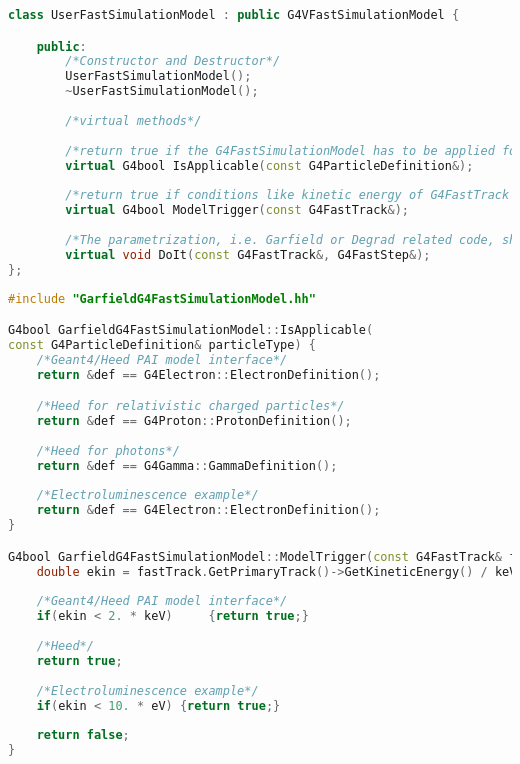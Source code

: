 \documentclass[preprint,12pt,sort&compress]{elsarticle}
\begin{document}
\newpage

\begin{lstlisting}[label=code_G4FastSimulationModel_class,language=C++,caption=Class definition of the user-defined class derived from the G4VFastSimulationModel. ]
class UserFastSimulationModel : public G4VFastSimulationModel {

	public:
	    /*Constructor and Destructor*/
	    UserFastSimulationModel();
	    ~UserFastSimulationModel();
	    
	    /*virtual methods*/
	    
	    /*return true if the G4FastSimulationModel has to be applied for a particle type*/
	    virtual G4bool IsApplicable(const G4ParticleDefinition&);
	    
	    /*return true if conditions like kinetic energy of G4FastTrack are fulfilled*/
	    virtual G4bool ModelTrigger(const G4FastTrack&);
	    
	    /*The parametrization, i.e. Garfield or Degrad related code, should be implemented here*/
	    virtual void DoIt(const G4FastTrack&, G4FastStep&);
};
\end{lstlisting}

\newpage

\begin{lstlisting}[label=code_G4FastSimulationModel,caption=G4FastSimulationModel.,language=C++]
#include "GarfieldG4FastSimulationModel.hh"

G4bool GarfieldG4FastSimulationModel::IsApplicable(
const G4ParticleDefinition& particleType) {
	/*Geant4/Heed PAI model interface*/
	return &def == G4Electron::ElectronDefinition();

	/*Heed for relativistic charged particles*/
	return &def == G4Proton::ProtonDefinition();
	
	/*Heed for photons*/
	return &def == G4Gamma::GammaDefinition();
	
	/*Electroluminescence example*/
	return &def == G4Electron::ElectronDefinition();
}

G4bool GarfieldG4FastSimulationModel::ModelTrigger(const G4FastTrack& fastTrack) {
	double ekin = fastTrack.GetPrimaryTrack()->GetKineticEnergy() / keV;
	
	/*Geant4/Heed PAI model interface*/
	if(ekin < 2. * keV) 	{return true;}
	
	/*Heed*/
	return true;
	
	/*Electroluminescence example*/
	if(ekin < 10. * eV) {return true;}
	
	return false;
}
\end{lstlisting}
\end{document}
